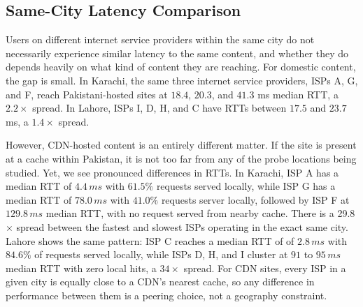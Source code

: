 \documentclass[sigconf,anonymous,10pt]{acmart}
\begin{document}


\subsection{Same-City Latency Comparison}
\label{sec:rq2}

Users on different internet service providers within the same city do not necessarily experience similar latency to the same content, and whether they do depends heavily on what kind of content they are reaching. For domestic content, the gap is small. In Karachi, the same three internet service providers, ISPs A, G, and F, reach Pakistani-hosted sites at $18.4$, $20.3$, and $41.3$ ms median RTT, a $2.2\times$ spread. In Lahore, ISPs I, D, H, and C have RTTs between $17.5$ and $23.7$ ms, a $1.4\times$ spread.

However, CDN-hosted content is an entirely different matter. If the site is present at a cache within Pakistan, it is not too far from any of the probe locations being studied. Yet, we see pronounced differences in RTTs. In Karachi, ISP A has a median RTT of $4.4\,ms$ with $61.5\%$ requests served locally, while ISP G has a median RTT of $78.0\,ms$ with $41.0\%$ requests server locally, followed by ISP F at $129.8\,ms$ median RTT, with no request served from nearby cache. There is a 29.8$\times$ spread between the fastest and slowest ISPs operating in the exact same city. Lahore shows the same pattern: ISP C reaches a median RTT of of $2.8\,ms$ with $84.6\%$ of requests served locally, while ISPs D, H, and I cluster at $91$ to $95\,ms$ median RTT with zero local hits, a $34\times$ spread. For CDN sites, every ISP in a given city is equally close to a CDN's nearest cache, so any difference in performance between them is a peering choice, not a geography constraint. 
\end{document}
